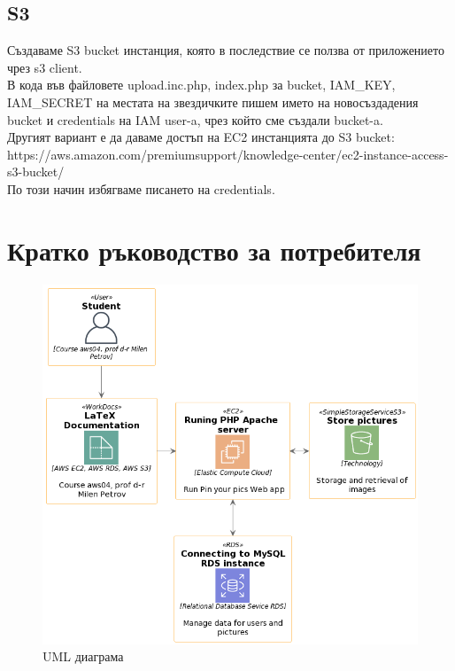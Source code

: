 \documentclass[12pt]{article}
\begin{document}
 
\subsection{S3}
Създаваме S3 bucket инстанция, която в последствие се ползва от приложението чрез s3 client. \\
В кода във файловете upload.inc.php, index.php за bucket, IAM\_KEY, IAM\_SECRET на местата на звездичките пишем името на новосъздадения bucket и credentials на IAM user-a, чрез който сме създали bucket-a.\\
Другият вариант е да даваме достъп на EC2 инстанцията до S3 bucket: \\
https://aws.amazon.com/premiumsupport/knowledge-center/ec2-instance-access-s3-bucket/ \\
По този начин избягваме писането на credentials.

\newpage


\medskip

\section{Кратко ръководство за потребителя}
\begin{figure}[!htb] 
    \centering
        \includegraphics[scale=0.55]{diagram-docs.png}
        \newline \caption{UML диаграма}
\end{figure}
\end{document}
